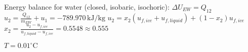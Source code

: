 Energy balance for water (closed, isobaric, isochoric):  
\( \Delta U_{EW} = Q_{12} \)  
\( u_2 = \frac{Q_{12}}{m_{EW}} + u_1 = -789.970 \, \text{kJ/kg} \)  
\( u_2 = x_2 (u_{f,ice} + u_{f,liquid}) + (1 - x_2) u_{f,ice} \)  
\( x_2 = \frac{u_2 - u_{f,ice}}{u_{f,liquid} - u_{f,ice}} = 0.5548 \approx 0.555 \)  

\( T = 0.01^\circ \text{C} \)
